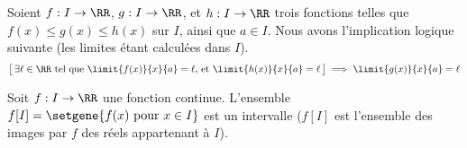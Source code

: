 \begin{fact} \label{lim-cops}
	Soient
	$f: I \to \RR$,
	$g: I \to \RR$,
	et
	$h: I \to \RR$
	trois fonctions telles que
	$f(x) \leq g(x) \leq h(x)$ sur $I$,
	ainsi que
	$a \in I$.
	Nous avons l'implication logique suivante (les limites étant calculées dans $I$).
	\[
		\big[\,
			\text{$\exists \ell \in \RR$ tel que
			      $\limit{f(x)}{x}{a} = \ell$,
			      et
			      $\limit{h(x)}{x}{a} = \ell$}
		\,\big]
		\implies
		\limit{g(x)}{x}{a} = \ell
	\]
\end{fact}




\begin{fact} \label{tvi}
	Soit
	$f: I \to \RR$ une fonction continue.
	L'ensemble $f[I] = \setgene{f(x) \text{ pour } x \in I}$ est un intervalle ($f[I]$ est l'ensemble des images par $f$ des réels appartenant à $I$).
\end{fact}

